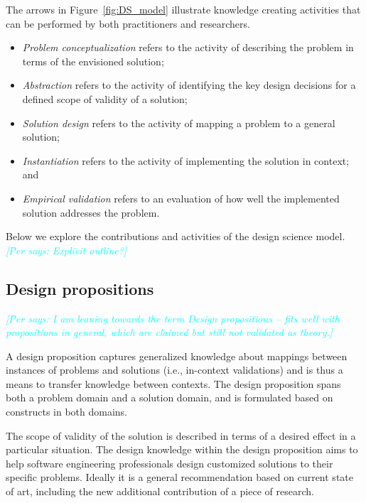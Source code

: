 \documentclass[graybox]{svmult}
\newcommand{\per}[1]{\textcolor{cyan}{{\it [Per says: #1]}}}
\newcommand{\per}[1]{}
\begin{document}
The arrows in Figure~\ref{fig:DS_model} illustrate knowledge creating activities that can be performed by both practitioners and researchers. 
\begin{itemize}
\item \emph{Problem conceptualization} refers to the activity of describing the problem in terms of the envisioned solution; 
\item \emph{Abstraction} refers to the activity of identifying the key design decisions for a defined scope of validity of a solution; 
\item \emph{Solution design} refers to the activity of mapping a problem to a general solution; 
\item \emph{Instantiation} refers to the activity of implementing the solution in context; and 
\item \emph{Empirical validation} refers to an evaluation of how well the implemented solution addresses the problem.
\end{itemize}

Below we explore the contributions and activities of the design science model. \per{Explicit outline?}

\subsection{Design propositions}
\label{sec:technologicalrules}

\per{I am leaning towards the term Design propositions -- fits well with propositions in general, which are claimed but still not validated as theory.}

A design proposition captures generalized knowledge about mappings between instances of problems and solutions (i.e., in-context validations) and is thus a means to transfer knowledge between contexts. The design proposition spans both a problem domain and a solution domain, and is formulated based on constructs in both domains. 

The scope of validity of the solution is described in terms of a desired effect in a particular situation.   The design knowledge within the design proposition aims to help software engineering professionals design customized solutions to their specific problems. Ideally it is a general recommendation based on current state of art, including the new additional contribution of a piece of research.
\end{document}
